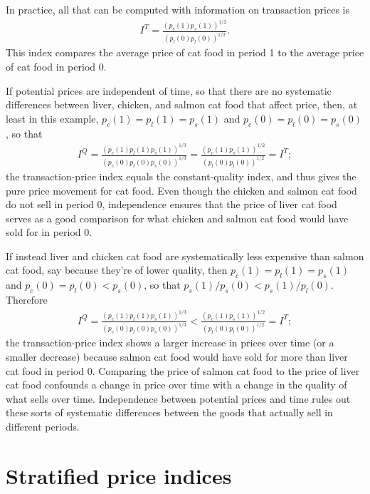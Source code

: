 \documentclass[]{article}
\begin{document}
In practice, all that can be computed with information on transaction prices is
\begin{align*}
I^{T} = \frac{(p_{c}(1) p_{s}(1))^{1 / 2}}{(p_{l}(0) p_{l}(0))^{1 / 2}}.
\end{align*}
This index compares the average price of cat food in period 1 to the average price of cat food in period 0.

If potential prices are independent of time, so that there are no systematic differences between liver, chicken, and salmon cat food that affect price, then, at least in this example, \(p_{c}(1) = p_{l}(1) = p_{s}(1)\) and \(p_{c}(0) = p_{l}(0) = p_{s}(0)\), so that
\begin{align*}
I^{Q} = \frac{(p_{c}(1) p_{l}(1) p_{s}(1))^{1 / 3}}{(p_{c}(0) p_{l}(0) p_{s}(0))^{1 / 3}} = \frac{(p_{c}(1) p_{s}(1))^{1 / 2}}{(p_{l}(0) p_{l}(0))^{1 / 2}} = I^{T};
\end{align*}
the transaction-price index equals the constant-quality index, and thus gives the pure price movement for cat food. Even though the chicken and salmon cat food do not sell in period 0, independence ensures that the price of liver cat food serves as a good comparison for what chicken and salmon cat food would have sold for in period 0.

If instead liver and chicken cat food are systematically less expensive than salmon cat food, say because they're of lower quality, then \(p_{c}(1) = p_{l}(1) = p_{s}(1)\) and \(p_{c}(0) = p_{l}(0) < p_{s}(0)\), so that \(p_{s}(1) / p_{s}(0) < p_{s}(1) / p_{l}(0)\). Therefore
\begin{align*}
I^{Q} = \frac{(p_{c}(1) p_{l}(1) p_{s}(1))^{1 / 3}}{(p_{c}(0) p_{l}(0) p_{s}(0))^{1 / 3}} < \frac{(p_{c}(1) p_{s}(1))^{1 / 2}}{(p_{l}(0) p_{l}(0))^{1 / 2}} = I^{T};
\end{align*}
the transaction-price index shows a larger increase in prices over time (or a smaller decrease) because salmon cat food would have sold for more than liver cat food in period 0. Comparing the price of salmon cat food to the price of liver cat food confounds a change in price over time with a change in the quality of what sells over time. Independence between potential prices and time rules out these sorts of systematic differences between the goods that actually sell in different periods.

\hypertarget{stratified-price-indices}{%
\section{Stratified price indices}\label{stratified-price-indices}}
\end{document}
